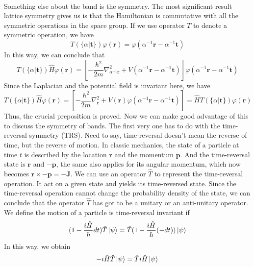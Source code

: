 \documentclass{article}
\begin{document}
\\
Something else about the band is the symmetry. The most significant result lattice symmetry gives us is that the Hamiltonian is commutative with all the symmetric operations in the space group. If we use operator $T$ to denote a symmetric operation, we have\begin{equation}
    T(\{\alpha|\mathbf{t}\})\varphi(\mathbf{r})=\varphi(\alpha^{-1}\mathbf{r}-\alpha^{-1}\mathbf{t})
\end{equation}In this way, we can conclude that\begin{equation}
    T(\{\alpha|\mathbf{t}\})\hat{H}\varphi(\mathbf{r})=[-\frac{\hbar^2}{2m}\nabla_{\alpha^{-1}\mathbf{r}}^2+V(\alpha^{-1}\mathbf{r}-\alpha^{-1}\mathbf{t})]\varphi(\alpha^{-1}\mathbf{r}-\alpha^{-1}\mathbf{t})
\end{equation}Since the Laplacian and the potential field is invariant here, we have\begin{equation}
    T(\{\alpha|\mathbf{t}\})\hat{H}\varphi(\mathbf{r})=[-\frac{\hbar^2}{2m}\nabla_{\mathbf{r}}^2+V(\mathbf{r})\varphi(\alpha^{-1}\mathbf{r}-\alpha^{-1}\mathbf{t})]=\hat{H}T(\{\alpha|\mathbf{t}\})\varphi(\mathbf{r})
\end{equation}Thus, the crucial preposition is proved. Now we can make good advantage of this to discuss the symmetry of bands. The first very one has to do with the time-reversal symmetry (TRS). Need to say, time-reversal doesn't mean the reverse of time, but the reverse of motion. In classic mechanics, the state of a particle at time $t$ is described by the location $\mathbf{r}$ and the momentum $\mathbf{p}$. And the time-reversal state is $\mathbf{r}$ and $-\mathbf{p}$, the same also applies for its angular momentum, which now becomes $\mathbf{r}\times-\mathbf{p}=-\mathbf{J}$. We can use an operator $\hat{T}$ to represent the time-reversal operation. It act on a given state and yields its time-reversed state. Since the time-reversal operation cannot change the probability density of the state, we can conclude that the operator $\hat{T}$ has got to be a unitary or an anti-unitary operator. We define the motion of a particle is time-reversal invariant if\begin{equation}
    (1-\frac{i\hat{H}}{\hbar}dt)\hat{T}\ket\psi=\hat{T}(1-\frac{i\hat{H}}{\hbar}(-dt))\ket\psi
\end{equation}
In this way, we obtain\begin{equation}
    -i\hat{H}\hat{T}\ket\psi=\hat{T}i\hat{H}\ket{\psi}
\end{equation}
\end{document}
